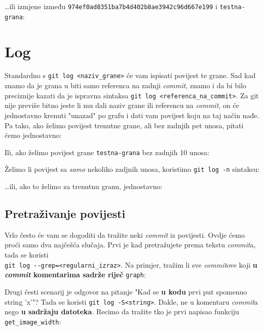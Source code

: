 \dots{}ili izmjene između \verb+974ef0ad8351ba7b4d402b8ae3942c96d667e199+ i \verb+testna-grana+:


\section*{Log}

Standardno s \verb+git log <naziv_grane>+ će vam ispisati povijest te grane.
Sad kad znamo da je grana u biti samo referenca na zadnji \emph{commit}, znamo i da bi bilo preciznije kazati da je ispravna sintaksa \verb+git log <referenca_na_commit>+.
Za git nije previše bitno jeste li mu dali naziv grane ili referencu na \emph{commit}, on će jednostavno krenuti "unazad" po grafu i dati vam povijest koju na taj način nađe.
Pa tako, ako želimo povijest trenutne grane, ali bez zadnjih pet unosa, pitati ćemo jednostavno:


Ili, ako želimo povijest grane \verb+testna-grana+ bez zadnjih 10 unosa:


Želimo li povijest sa \emph{samo} nekoliko zadjnih unosa, koristimo \verb+git log -n+ sintaksu:


\dots{}ili, ako to želimo za trenutnu granu, jednostavno:


\subsection*{Pretraživanje povijesti}

Vrlo često će vam se dogoditi da tražite neki \emph{commit} iz povijesti.
Ovdje ćemo proći samo dva najčešća slučaja.
Prvi je kad pretražujete prema tekstu \emph{commit}a, tada se koristi \\\verb+git log --grep=<regularni_izraz>+.
Na primjer, tražim li sve \emph{commit}ove koji \textbf{u \emph{commit} komentarima sadrže riječ} \verb+graph+:


Drugi česti scenarij je odgovor na pitanje "Kad se \textbf{u kodu} prvi put spomenuo string 'x'"? Tada se koristi \verb+git log -S<string>+.
Dakle, ne u komentaru \emph{commit}a nego \textbf{u sadržaju datoteka}.
Recimo da tražite tko je prvi napisao funkciju \verb+get_image_width+:

